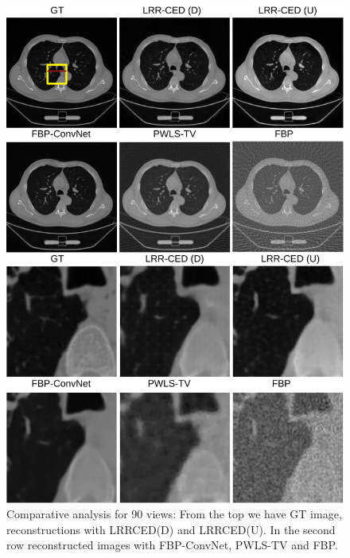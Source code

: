 \begin{figure}[!t]
	\centering
	\includegraphics[width=1.0\linewidth]{./Figures/result2-crop.pdf}
	\caption{Comparative analysis for 90 views: From the top we have \ac{GT} image, reconstructions with \ac{LRRCED}(D) and \ac{LRRCED}(U). In the second row reconstructed images with FBP-ConvNet, PWLS-TV and \ac{FBP}.}
	\label{fig:res_90}
\end{figure}

